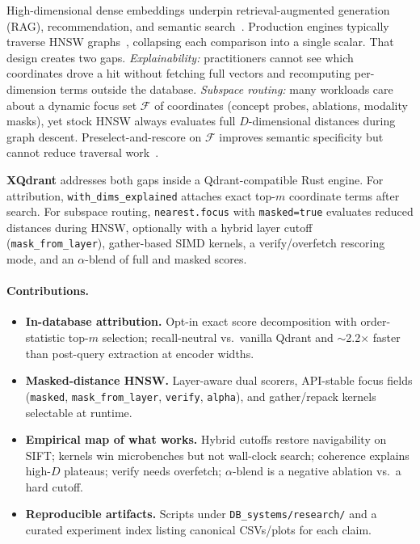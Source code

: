 \documentclass[11pt,a4paper]{article}
\begin{document}
High-dimensional dense embeddings underpin retrieval-augmented generation
(RAG), recommendation, and semantic search~\cite{lewis2020rag,qdrant2024,wang2021milvus}.
Production engines typically traverse HNSW graphs~\cite{malkov2018hnsw},
collapsing each comparison into a single scalar.
That design creates two gaps.
\emph{Explainability:} practitioners cannot see which coordinates drove a hit
without fetching full vectors and recomputing per-dimension terms outside the
database.
\emph{Subspace routing:} many workloads care about a dynamic focus set
$\mathcal{F}$ of coordinates (concept probes, ablations, modality masks), yet
stock HNSW always evaluates full $D$-dimensional distances during graph descent.
Preselect-and-rescore on $\mathcal{F}$ improves semantic specificity but cannot
reduce traversal work~\cite{xqdrant2026}.

\textbf{XQdrant} addresses both gaps inside a Qdrant-compatible Rust engine.
For attribution, \texttt{with\_dims\_explained} attaches exact top-$m$ coordinate
terms after search.
For subspace routing, \texttt{nearest.focus} with \texttt{masked=true} evaluates
reduced distances during HNSW, optionally with a hybrid layer cutoff
(\texttt{mask\_from\_layer}), gather-based SIMD kernels, a verify/overfetch
rescoring mode, and an $\alpha$-blend of full and masked scores.

\paragraph{Contributions.}
\begin{itemize}
  \item \textbf{In-database attribution.} Opt-in exact score decomposition with
    order-statistic top-$m$ selection; recall-neutral vs.\ vanilla Qdrant and
    $\sim$2.2$\times$ faster than post-query extraction at encoder widths.
  \item \textbf{Masked-distance HNSW.} Layer-aware dual scorers, API-stable
    focus fields (\texttt{masked}, \texttt{mask\_from\_layer}, \texttt{verify},
    \texttt{alpha}), and gather/repack kernels selectable at runtime.
  \item \textbf{Empirical map of what works.} Hybrid cutoffs restore navigability
    on SIFT; kernels win microbenches but not wall-clock search; coherence
    explains high-$D$ plateaus; verify needs overfetch; $\alpha$-blend is a
    negative ablation vs.\ a hard cutoff.
  \item \textbf{Reproducible artifacts.} Scripts under \texttt{DB\_systems/research/}
    and a curated experiment index listing canonical CSVs/plots for each claim.
\end{itemize}
\end{document}
